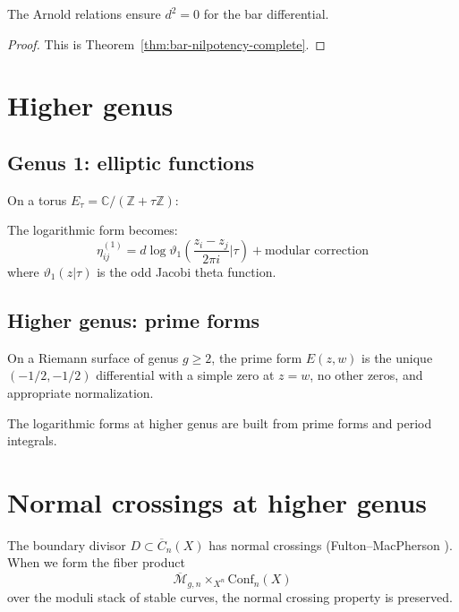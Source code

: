 \begin{corollary}
\label{cor:bar-d-squared-zero}
The Arnold relations ensure $d^2 = 0$ for the bar differential.
\end{corollary}
\begin{proof}
This is Theorem~\ref{thm:bar-nilpotency-complete}.
\end{proof}

\section{Higher genus}

\subsection{Genus 1: elliptic functions}

On a torus $E_\tau = \mathbb{C}/(\mathbb{Z} + \tau\mathbb{Z})$:

\begin{theorem}
\label{thm:elliptic-logarithmic-forms}
The logarithmic form becomes:
\[\eta_{ij}^{(1)} = d\log\vartheta_1\left(\frac{z_i - z_j}{2\pi i}\Big|\tau\right) + \text{modular correction}\]
where $\vartheta_1(z|\tau)$ is the odd Jacobi theta function.
\end{theorem}

\subsection{Higher genus: prime forms}

\begin{definition}
On a Riemann surface of genus $g \geq 2$, the prime form $E(z,w)$ is the unique $(-1/2, -1/2)$ differential with a simple zero at $z = w$, no other zeros, and appropriate normalization.
\end{definition}

The logarithmic forms at higher genus are built from prime forms and period integrals.

\section{Normal crossings at higher genus}
\label{sec:normal-crossings-higher-genus}

\begin{theorem}\label{thm:normal-crossings-preservation}
The boundary divisor $D \subset \overline{C}_n(X)$ has normal crossings (Fulton--MacPherson
\cite{FM94}). When we form the fiber product
\[\overline{\mathcal{M}}_{g,n} \times_{X^n} \text{Conf}_n(X)\]
over the moduli stack of stable curves, the normal crossing property is preserved.
\end{theorem}

